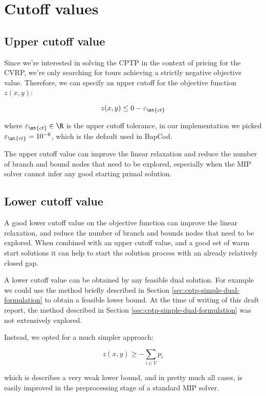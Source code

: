 \section{Cutoff values}


\subsection{Upper cutoff value}
Since we're interested in solving the CPTP in the context of pricing for the CVRP, we're only searching for tours achieving a strictly negative objective value.
Therefore, we can specify an upper cutoff for the objective function $z(x, y)$:

\begin{equation}
	z(x, y) \le 0 - \varepsilon_{\mt{ct}}
\end{equation}

where $\varepsilon_{\mt{ct}} \in \R$ is the upper cutoff tolerance, in our implementation we picked $\varepsilon_{\mt{ct}} = 10^{-6}$, which is the default used in BapCod.

The upper cutoff value can improve the linear relaxation and reduce the number of branch and bound nodes that need to be explored, especially when the MIP solver cannot infer any good starting primal solution.

\subsection{Lower cutoff value}
A good lower cutoff value on the objective function can improve the linear relaxation, and reduce the number of branch and bounds nodes that need to be explored.
When combined with an upper cutoff value, and a good set of warm start solutions it can help to start the solution process with an already relatively closed gap.

A lower cutoff value can be obtained by any feasible dual solution.
For example we could use the method briefly described in Section \ref{sec:cptp-simple-dual-formulation} to obtain a feasible lower bound.
At the time of writing of this draft report, the method described in Section \ref{sec:cptp-simple-dual-formulation} was not extensively explored.

Instead, we opted for a much simpler approach:

\begin{equation}
	z(x, y) \ge - \sum_{i \in V} p_i
\end{equation}

which is describes a very weak lower bound, and in pretty much all cases, is easily improved in the preprocessing stage of a standard MIP solver.

